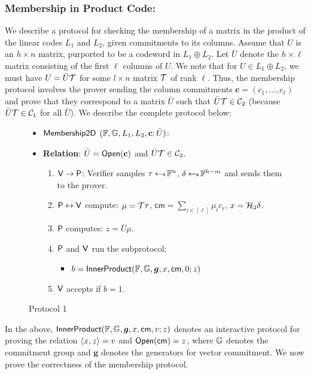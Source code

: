 \subsubsection{Membership in Product Code:}
We describe a protocol for checking the membership of a matrix in the  product of
the linear codes $L_1$ and $L_2$, given commitments to its columns. 
Assume that $U$ is an $h\times n$ matrix, purported to be a codeword in
$L_1\oplus L_2$. Let $\bar{U}$ denote the $h\times \ell$ matrix consisting of
the first $\ell$ columns of $U$. We note that for $U\in L_1\oplus L_2$, we must
have $U=\bar{U}\mathcal{T}$ for some $l\times n$ matrix $\mathcal{T}$ of rank $\ell$. Thus, the membership protocol involves the prover sending the column
commitments $\bm{c}=(c_1,\ldots,c_\ell)$ and prove that they correspond to a matrix
$\bar{U}$ such that $\bar{U}\mathcal{T}\in \mathcal{C}_2$ (because $\bar{U}\mathcal{T}\in
\mathcal{C}_1$ for all $\bar{U}$). We describe the complete
protocol below:
\begin{figure}[ht]
\begin{framed}
\begin{itemize}
\item {$\mathsf{Membership2D}$} $(\mathbb{F},\mathbb{G}, L_1, L_2,\mathbf{c}; \bar{U})$:
\item {\bf Relation}: $\bar{U}=\mathsf{Open}(\mathbf{c})$ and $\bar{U}\mathcal{T}\in \mathcal{C}_2$.
\begin{enumerate}[{\rm 1.}]
\item $\mathsf{V}\rightarrow \mathsf{P}$: Verifier samples $\tau\hskip2.3pt{\gets\!\!\mbox{\tiny${\$}$\normalsize}}\,
\mathbb{F}^n$, $\delta\hskip2.3pt{\gets\!\!\mbox{\tiny${\$}$\normalsize}}\, \mathbb{F}^{h-m}$ and sends them to the prover.
\item $\mathsf{P}\leftrightarrow \mathsf{V}$ compute: $\mu=\mathcal{T}\tau$,
$\mathsf{cm} = \sum_{i\in [\ell]} \mu_ic_i$, $x=\mathcal{H}_2\delta$.
\item $\mathsf{P}$ computes: $z=\bar{U}\mu$.
\item $\mathsf{P}$ and $\mathsf{V}$ run the subprotocol:
	\begin{itemize}
	\item $b=\mathsf{InnerProduct}(\mathbb{F},\mathbb{G},\bm{g},x,\mathsf{cm},0;z)$
	\end{itemize}
\item $\mathsf{V}$ accepts if $b=1$.
\end{enumerate}
\end{itemize}
\end{framed}
\caption{Protocol 1}
\label{fig:protocol1}
\end{figure}

In the above,
$\mathsf{InnerProduct}(\mathbb{F},\mathbb{G},\bm{g},x,\mathsf{cm},v;z)$ denotes an interactive
protocol for proving the relation $\langle x,z\rangle=v$ and $\mathsf{Open}(\mathsf{cm})=z$,
where $\mathbb{G}$ denotes the commitment group and $\bm{g}$ denotes the generators for
vector commitment. We now prove the correctness of the membership protocol.

